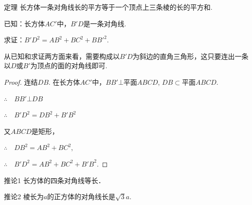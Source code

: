 \begin{thm}
  {定理} 长方体一条对角线长的平方等于一个顶点上三条棱的长的平方和.  
\end{thm}

 已知：长方体$AC'$中，$B'D$是一条对角线.

    求证：$B'D^2=AB^2+BC^2+{BB'}^2$.
    
    \begin{analyze}
        从已知和求证两方面来看，需要构成以$B'D$为斜边的直角三角形，这只要连出一条以$D$或$B'$为顶点的面的对角线即可.
    \end{analyze}


\begin{proof}
连结$DB$. 在长方体$AC'$中，$BB'\bot $平面$ABCD$, $DB\subset$平面$ABCD$.

\noindent
\begin{minipage}{.55\textwidth}\CTEXindent
$\therefore\quad BB'\bot DB$

$\therefore\quad B'D^2=DB^2+B'B^2$

又$ABCD$是矩形，

$\therefore\quad DB^2=AB^2+BC^2$,

$\therefore\quad B'D^2=AB^2+BC^2+{B'B}^2$.
\end{minipage}
\hfill
\begin{minipage}{.43\textwidth}
\centering
{}
\end{minipage}
\end{proof}



\begin{thm}
    {推论1} 长方体的四条对角线等长．
\end{thm}

 \begin{thm}   
{推论2} 棱长为$a$的正方体的对角线长是$\sqrt{3}a$.
\end{thm}


